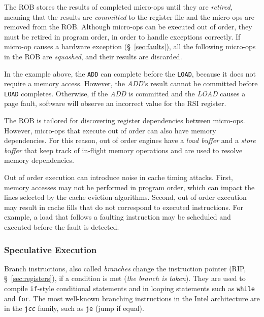 The ROB stores the results of completed micro-ops until they are
\textit{retired}, meaning that the results are \textit{committed} to the
register file and the micro-ops are removed from the ROB. Although micro-ops
can be executed out of order, they must be retired in program order, in order
to handle exceptions correctly. If micro-op causes a hardware exception
(\S~\ref{sec:faults}), all the following micro-ops in the ROB are
\textit{squashed}, and their results are discarded.

In the example above, the \texttt{ADD} can complete before the \texttt{LOAD},
because it does not require a memory access. However, the \textit{ADD}'s result
cannot be committed before \texttt{LOAD} completes. Otherwise, if the
\textit{ADD} is committed and the \textit{LOAD} causes a page fault, software
will observe an incorrect value for the  RSI register.


The ROB is tailored for discovering register dependencies between micro-ops.
However, micro-ops that execute out of order can also have memory dependencies.
For this reason, out of order engines have a \textit{load buffer} and a
\textit{store buffer} that keep track of in-flight memory operations and are
used to resolve memory dependencies.

Out of order execution can introduce noise in cache timing attacks. First,
memory accesses may not be performed in program order, which can impact the
lines selected by the cache eviction algorithms. Second, out of order execution
may result in cache fills that do not correspond to executed instructions. For
example, a load that follows a faulting instruction may be scheduled and
executed before the fault is detected.


\subsubsection{Speculative Execution}


Branch instructions, also called \textit{branches} change the instruction
pointer (RIP, \S~\ref{sec:registers}), if a condition is met (\textit{the
branch is taken}). They are used to compile \texttt{if}-style conditional
statements and in looping statements such as \texttt{while} and \texttt{for}.
The most well-known branching instructions in the Intel architecture are in the
\texttt{j\textit{cc}} family, such as \texttt{je} (jump if equal).

